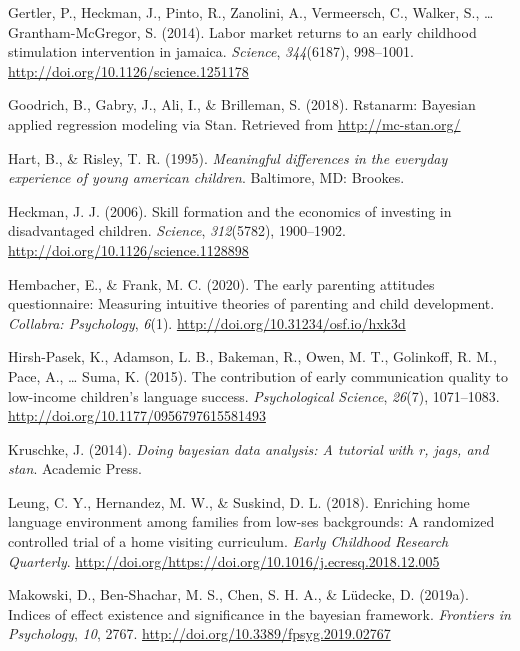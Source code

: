 \documentclass[man,floatsintext]{apa6}
\begin{document}
\leavevmode\hypertarget{ref-Jamaica2014}{}%
Gertler, P., Heckman, J., Pinto, R., Zanolini, A., Vermeersch, C., Walker, S., \ldots{} Grantham-McGregor, S. (2014). Labor market returns to an early childhood stimulation intervention in jamaica. \emph{Science}, \emph{344}(6187), 998--1001. \url{http://doi.org/10.1126/science.1251178}

\leavevmode\hypertarget{ref-rstanarm}{}%
Goodrich, B., Gabry, J., Ali, I., \& Brilleman, S. (2018). Rstanarm: Bayesian applied regression modeling via Stan. Retrieved from \url{http://mc-stan.org/}

\leavevmode\hypertarget{ref-Hart1995}{}%
Hart, B., \& Risley, T. R. (1995). \emph{Meaningful differences in the everyday experience of young american children}. Baltimore, MD: Brookes.

\leavevmode\hypertarget{ref-Heckman2006}{}%
Heckman, J. J. (2006). Skill formation and the economics of investing in disadvantaged children. \emph{Science}, \emph{312}(5782), 1900--1902. \url{http://doi.org/10.1126/science.1128898}

\leavevmode\hypertarget{ref-Hembacher2020}{}%
Hembacher, E., \& Frank, M. C. (2020). The early parenting attitudes questionnaire: Measuring intuitive theories of parenting and child development. \emph{Collabra: Psychology}, \emph{6}(1). \url{http://doi.org/10.31234/osf.io/hxk3d}

\leavevmode\hypertarget{ref-HirshPasek2015}{}%
Hirsh-Pasek, K., Adamson, L. B., Bakeman, R., Owen, M. T., Golinkoff, R. M., Pace, A., \ldots{} Suma, K. (2015). The contribution of early communication quality to low-income children's language success. \emph{Psychological Science}, \emph{26}(7), 1071--1083. \url{http://doi.org/10.1177/0956797615581493}

\leavevmode\hypertarget{ref-Kruschke2014}{}%
Kruschke, J. (2014). \emph{Doing bayesian data analysis: A tutorial with r, jags, and stan}. Academic Press.

\leavevmode\hypertarget{ref-Leung2018}{}%
Leung, C. Y., Hernandez, M. W., \& Suskind, D. L. (2018). Enriching home language environment among families from low-ses backgrounds: A randomized controlled trial of a home visiting curriculum. \emph{Early Childhood Research Quarterly}. \url{http://doi.org/https://doi.org/10.1016/j.ecresq.2018.12.005}

\leavevmode\hypertarget{ref-Makowski2019}{}%
Makowski, D., Ben-Shachar, M. S., Chen, S. H. A., \& Lüdecke, D. (2019a). Indices of effect existence and significance in the bayesian framework. \emph{Frontiers in Psychology}, \emph{10}, 2767. \url{http://doi.org/10.3389/fpsyg.2019.02767}
\end{document}
